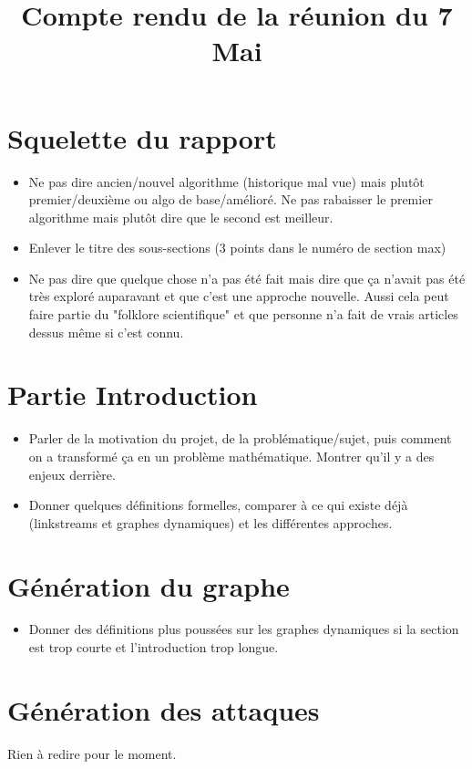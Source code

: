 \documentclass{article}
\title{Compte rendu de la réunion du 7 Mai}
\date{}
\begin{document}
	
\maketitle
	
\section*{Squelette du rapport}
	\begin{itemize}
		\item Ne pas dire ancien/nouvel algorithme (historique mal vue) mais plutôt premier/deuxième ou algo de base/amélioré. Ne pas rabaisser le premier algorithme mais plutôt dire que le second est meilleur.
		\item Enlever le titre des sous-sections (3 points dans le numéro de section max)
		\item Ne pas dire que quelque chose n'a pas été fait mais dire que ça n'avait pas été très exploré auparavant et que c'est une approche nouvelle. Aussi cela peut faire partie du "folklore scientifique" et que personne n'a fait de vrais articles dessus même si c'est connu.
	\end{itemize}

\section*{Partie Introduction}
	\begin{itemize}
		\item Parler de la motivation du projet, de la problématique/sujet, puis comment on a transformé ça en un problème mathématique. Montrer qu'il y a des enjeux derrière.
		\item Donner quelques définitions formelles, comparer à ce qui existe déjà (linkstreams et graphes dynamiques) et les différentes approches.
	\end{itemize}

\section*{Génération du graphe}
	\begin{itemize}
		\item Donner des définitions plus poussées sur les graphes dynamiques si la section est trop courte et l'introduction trop longue.
	\end{itemize}

\section*{Génération des attaques}
	Rien à redire pour le moment.
\end{document}
